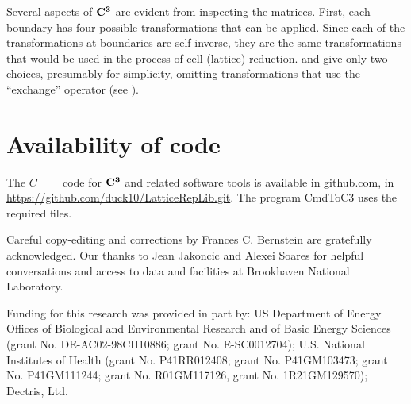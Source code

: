 \documentclass[preprint]{iucr}              %
\numberwithin{equation}{section}
\newcommand{\CIII}[0]{$\bf{C^{3}}$}
\begin{document}
	Several aspects of \CIII{} are evident from inspecting the matrices. 
	First, each boundary has four possible 
	transformations that can be applied. Since each of 
	the transformations at boundaries are self-inverse, they are the 
	same transformations that would be used in the process of 
	cell (lattice) reduction.  and  give only two choices, presumably for simplicity, 
	omitting transformations that use the ``exchange'' operator 
	(see ).
	
	
	
	
	
	
	\section{Availability of code}
	
	The $C^{++}$ ~code for \CIII{} and related 
	software tools is available in github.com, in
	\url{https://github.com/duck10/LatticeRepLib.git}.
	The program CmdToC3 uses the required files.
	
	
	
	
	Careful copy-editing and corrections by Frances C. Bernstein are 
	gratefully acknowledged.
	Our thanks to Jean Jakoncic and Alexei Soares for 
	helpful conversations and access to data and facilities at 
	Brookhaven National Laboratory.
	
	
	Funding for this research was provided in part by:  
	US Department of Energy Offices of Biological and 
	Environmental Research and of Basic Energy Sciences 
	(grant No. DE-AC02-98CH10886; grant No. E-SC0012704); 
	U.S. National Institutes of Health (grant No. P41RR012408; 
	grant No. P41GM103473; grant No. P41GM111244; 
	grant No. R01GM117126,
	grant No. 1R21GM129570); Dectris, Ltd.
	
	
	
	
	
	
	
	
	
\end{document}
